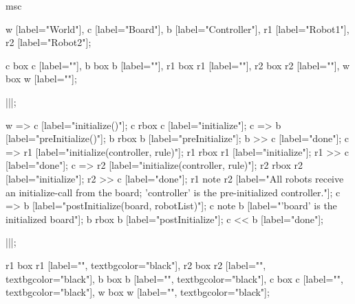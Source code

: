 \begin{msc}
msc
{

w [label="World"],
c [label="Board"],
b [label="Controller"],
r1 [label="Robot1"],
r2 [label="Robot2"];

c box c [label=""],
b box b [label=""],
r1 box r1 [label=""],
r2 box r2 [label=""],
w box w [label=""];

|||;

w => c [label="initialize()"];
c rbox c [label="initialize"];
c => b [label="preInitialize()"];
b rbox b [label="preInitialize"];
b >> c [label="done"];
c => r1 [label="initialize(controller, rule)"];
r1 rbox r1 [label="initialize"];
r1 >> c [label="done"];
c => r2 [label="initialize(controller, rule)"];
r2 rbox r2 [label="initialize"];
r2 >> c [label="done"];
r1 note r2 [label="All robots receive an initialize-call from the board; 'controller' is the pre-initialized controller."];
c => b [label="postInitialize(board, robotList)"];
c note b [label="'board' is the initialized board"];
b rbox b [label="postInitialize"];
c << b [label="done"];

|||;

r1 box r1 [label="", textbgcolor="black"],
r2 box r2 [label="", textbgcolor="black"],
b box b [label="", textbgcolor="black"],
c box c [label="", textbgcolor="black"],
w box w [label="", textbgcolor="black"];

}
\end{msc}
